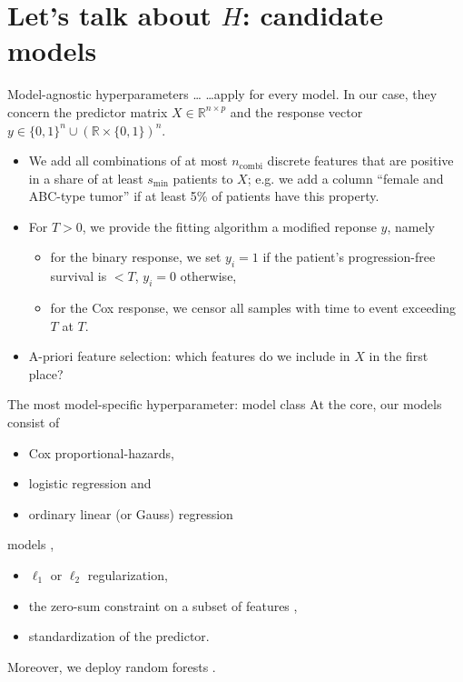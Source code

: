 \documentclass[10pt, aspectratio=169]{beamer}
\def\RR{\mathbb{R}}
\begin{document}
\section{Let's talk about $H$: candidate models}

\begin{frame}{Model-agnostic hyperparameters \ldots}
  \ldots apply for every model. In our case, they concern the predictor matrix 
  $X \in \RR^{n \times p}$ and the response vector $y \in \{ 0, 1 \}^n \cup 
  (\RR \times \{0, 1 \})^n$.

  \begin{itemize}
    \item We add all combinations of at most $n_{\text{combi}}$ discrete features 
      that are positive in a share of at least $s_{\text{min}}$ patients to $X$; e.g. 
      we add a column ``female and ABC-type tumor'' if at least 5\% of patients 
      have this property.
    \item For $T > 0$, we provide the fitting algorithm a modified reponse $y$, namely
      \begin{itemize}
        \item for the binary response, we set $y_i = 1$ if the patient's progression-free 
          survival is $< T$, $y_i = 0$ otherwise,
        \item for the Cox response, we censor all samples with time to event 
          exceeding $T$ at $T$.
      \end{itemize}
    \item A-priori feature selection: which features do we include in $X$ in the 
      first place?
  \end{itemize}
\end{frame}

\begin{frame}{The most model-specific hyperparameter: model class}
  At the core, our models consist of 
  \begin{itemize}
    \item Cox proportional-hazards,
    \item logistic regression and 
    \item ordinary linear (or Gauss) regression 
  \end{itemize}
  models \cite{zerosumR}, %
  \begin{itemize}
    \item $\ell_1$ or $\ell_2$ regularization,
    \item the zero-sum constraint on a subset of features \cite{transplatform17},
    \item standardization of the predictor.
  \end{itemize}

  Moreover, we deploy random forests \cite{ranger-gh}.
\end{frame}
\end{document}
